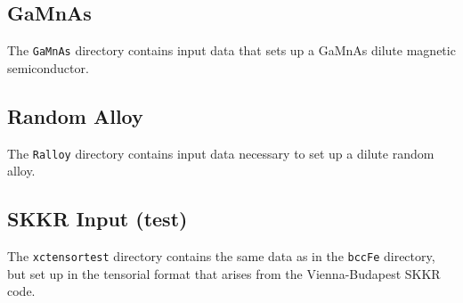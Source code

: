 \documentclass[11pt,fleqn,a4]{book} %
\begin{document}
\subsection{GaMnAs}
The \texttt{GaMnAs} directory contains input data that sets up a GaMnAs dilute magnetic semiconductor.

\subsection{Random Alloy}
The \texttt{Ralloy} directory contains input data necessary to set up a dilute random alloy.

\subsection{SKKR Input (test)}
The \texttt{xctensortest} directory contains the same data as in the \texttt{bccFe} directory, but set up in the tensorial format that arises from the Vienna-Budapest SKKR code.~\cite{Udvardi2003}


\end{document}

